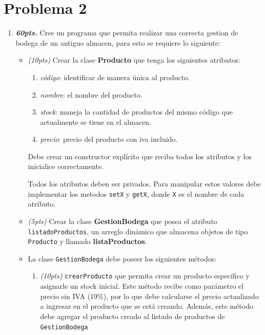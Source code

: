\documentclass{exam}
\begin{document}
\newpage
\vspace{-7mm}
\section{\textbf{Problema 2}}
\noindent

\begin{questions}

  \begin{enumerate}
  \item \textbf{\emph{60pts.}} Cree un programa que permita realizar una correcta gestion de bodega de un antiguo almacen, para esto se requiere  lo siguiente:
    \begin{itemize}

    \item \emph{(10pts)} Crear la clase \textbf{Producto} que tenga
      los siguientes atributos:

      \begin{enumerate}
      \item \emph{código}: identificar de manera única al producto.
      \item \emph{nombre}: el nombre del producto.
      \item \emph{stock}: maneja la cantidad de productos del mismo
        código que actualmente se tiene en el almacen.
      \item \emph{precio}: precio del producto con iva incluido.
      \end{enumerate}

      Debe crear un constructor explícito que reciba todos los
      atributos y los inicialice correctamente.

      Todos los atributos deben ser privados. Para manipular estos
      valores debe implementar los metodos \texttt{setX} y
      \texttt{getX}, donde \texttt{X} es el nombre de cada atributo.

    \item \emph{(5pts)} Crear la clase \textbf{GestionBodega} que
      posea el atributo \texttt{listadoProductos}, un arreglo dinámico
      que almacena objetos de tipo \texttt{Producto} y llamado
      \textbf{listaProductos}.

    \item La clase \texttt{GestionBodega} debe poseer los siguientes métodos:
      \begin{enumerate}

      \item \emph{(10pts)} \texttt{crearProducto} que permita crear un
        producto específico y asignarle un stock inicial. Este método
        recibe como parámetro el precio sin IVA (19\%), por lo que
        debe calcularse el precio actualizado a ingresar en el
        producto que se está creando. Además, este método debe agregar
        el producto creado al listado de productos de
        \texttt{GestionBodega}


\end{enumerate}
\end{itemize}
\end{enumerate}
\end{questions}
\end{document}
